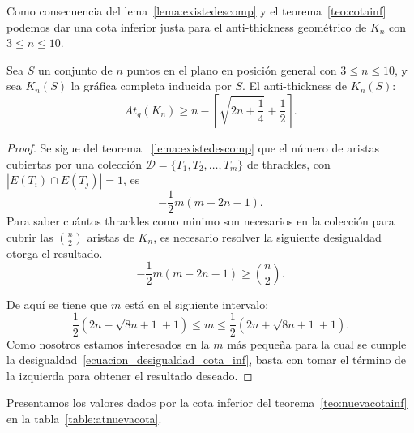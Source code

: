 Como consecuencia del lema~\ref{lema:existedescomp} y el teorema~\ref{teo:cotainf} podemos dar una cota inferior justa para el anti-thickness geométrico de $K_n$ con $3 \leq n \leq 10$.

\begin{theorem}\label{teo:nuevacotainf}
  Sea $S$ un conjunto de $n$ puntos en el plano en posición general con $3\leq n \leq 10$, y sea $K_n(S)$ la gráfica completa inducida por $S$. El anti-thickness de $K_n(S)$:
  \begin{equation}
    At_g(K_n) \geq n - \left\lceil\sqrt{2n+\frac{1}{4}} + \frac{1}{2}\right\rceil.
    \label{ecuacion_cota_inf}
  \end{equation}
\end{theorem}
\begin{proof}
  Se sigue del teorema ~\ref{lema:existedescomp} que el número de aristas
  cubiertas por una colección $\mathcal{D}=\{T_1,T_2,\dots,T_m\}$ de thrackles,
  con $|E(T_i)\cap E(T_j)| = 1$, es
  \[ -\frac{1}{2}m(m-2n-1). \]
  Para saber cuántos thrackles como minimo son necesarios en la colección para
  cubrir las $\binom{n}{2}$ aristas de $K_n$, es necesario resolver la
  siguiente desigualdad otorga el resultado.
  \begin{equation}
     -\frac{1}{2}m(m-2n-1) \geq \binom{n}{2}.
     \label{ecuacion_desigualdad_cota_inf}
  \end{equation}

  De aquí se tiene que $m$ está en el siguiente intervalo:
  \[
    \frac{1}{2}\left(2n-\sqrt{8n+1} + 1\right) \leq m \leq  \frac{1}{2}\left(2n+\sqrt{8n+1} + 1\right).
  \]
  Como nosotros estamos interesados en la $m$ más pequeña para la cual se cumple la desigualdad~\ref{ecuacion_desigualdad_cota_inf}, basta con tomar el término de la izquierda para obtener el resultado deseado.
\end{proof}
Presentamos los valores dados por la cota inferior del
teorema~\ref{teo:nuevacotainf} en la tabla~\ref{table:atnuevacota}.
